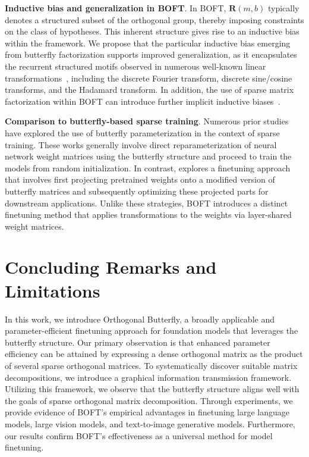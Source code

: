\textbf{Inductive bias and generalization in BOFT}. In BOFT, $\bm{R}(m,b)$ typically denotes a structured subset of the orthogonal group, thereby imposing constraints on the class of hypotheses. This inherent structure gives rise to an inductive bias within the framework. We propose that the particular inductive bias emerging from butterfly factorization supports improved generalization, as it encapsulates the recurrent structured motifs observed in numerous well-known linear transformations~\cite{dao2019kaleidoscope}, including the discrete Fourier transform, discrete sine/cosine transforms, and the Hadamard transform. In addition, the use of sparse matrix factorization within BOFT can introduce further implicit inductive biases~\cite{gunasekar2017implicit,li2018algorithmic,liu2019neural}.

\textbf{Comparison to butterfly-based sparse training}. Numerous prior studies~\cite{dao2019learning,dao2019kaleidoscope,chen2022pixelated,dao2022monarch} have explored the use of butterfly parameterization in the context of sparse training. These works generally involve direct reparameterization of neural network weight matrices using the butterfly structure and proceed to train the models from random initialization. In contrast, \cite{dao2022monarch} explores a finetuning approach that involves first projecting pretrained weights onto a modified version of butterfly matrices and subsequently optimizing these projected parts for downstream applications. Unlike these strategies, BOFT introduces a distinct finetuning method that applies transformations to the weights via layer-shared weight matrices.

\section{Concluding Remarks and Limitations}

In this work, we introduce Orthogonal Butterfly, a broadly applicable and parameter-efficient finetuning approach for foundation models that leverages the butterfly structure. Our primary observation is that enhanced parameter efficiency can be attained by expressing a dense orthogonal matrix as the product of several sparse orthogonal matrices. To systematically discover suitable matrix decompositions, we introduce a graphical information transmission framework. Utilizing this framework, we observe that the butterfly structure aligns well with the goals of sparse orthogonal matrix decomposition. Through experiments, we provide evidence of BOFT’s empirical advantages in finetuning large language models, large vision models, and text-to-image generative models. Furthermore, our results confirm BOFT’s effectiveness as a universal method for model finetuning.


